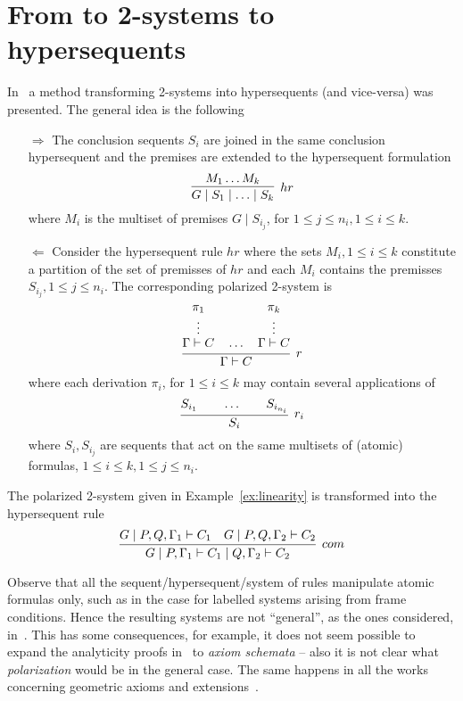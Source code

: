 \documentclass{llncs}
\begin{document}
\section{From to 2-systems to hypersequents}
In~\cite{DBLP:journals/tocl/CiabattoniG18} a method transforming 2-systems into hypersequents (and vice-versa) was presented. The general idea is the following
\begin{itemize}
\item[$\Rightarrow$] The conclusion sequents $S_i$ are joined in the same conclusion hypersequent and the premises are extended to the hypersequent formulation
\[
\infer[hr]{G\mid S_1\mid \ldots \mid S_k}
{M_1 \ldots M_k}
\]
where $M_i$ is the multiset of premises $G\mid S_{i_j}$, for $1\leq j\leq n_i, 1\leq i\leq k$.
\item[$\Leftarrow$] Consider the hypersequent rule $hr$ where the sets $M_i, 1 \leq i \leq k$ constitute a partition of the set of premisses of $hr$ and each $M_i$ contains the premisses $S_{i_j}, 1\leq j\leq n_i$. The corresponding polarized 2-system is
\[
\infer[r]{\Gamma\vdash C}
      {\deduce{\Gamma\vdash C\strut}
              {\deduce{\vdots}
                      {\pi_1}}\quad\ldots\quad
       \deduce{\Gamma\vdash C\strut}
              {\deduce{\vdots}
                      {\pi_k}}}
\]
where each derivation $\pi_i$, for $1\leq i \leq k$ may contain several applications of
\[
\infer[r_i]{S_i}
{S_{i_1}\qquad\ldots\qquad S_{i_{n_i}}}
\]
where $S_i,S_{i_j}$ are sequents that act on the same multisets of (atomic) formulas, $1\leq i\leq k, 1\leq j\leq n_i$. %
\end{itemize}
\begin{example}
The polarized 2-system given in Example~\ref{ex:linearity} is transformed 
into the hypersequent rule
\[
\infer[com]{G\mid P,\Gamma_1\vdash C_1\mid Q,\Gamma_2\vdash C_2}
{G\mid P,Q,\Gamma_1\vdash C_1 & G\mid  P,Q,\Gamma_2\vdash C_2}
\]
\end{example}
Observe that all the sequent/hypersequent/system of rules manipulate atomic formulas only, such as in the case for labelled systems arising from frame conditions. Hence the resulting systems are not ``general'', as the ones considered, \eg in~\cite{DBLP:conf/lics/CiabattoniGT08}. This has some consequences, for example, it does not seem possible to expand the analyticity proofs in~\cite{DBLP:journals/apal/MarinMPV22} to {\em axiom schemata} -- also it is not clear what {\em polarization} would be in the general case. The same happens in all the works concerning geometric axioms and extensions~\cite{NegVPl98,Neg03,Neg16,negri19}.
\end{document}
